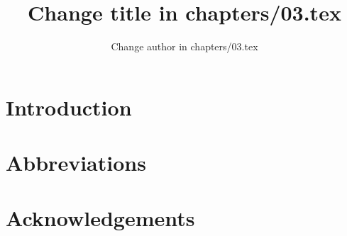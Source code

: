 \documentclass[output=paper]{langsci/langscibook}
\author{Change author in chapters/03.tex}
\title{Change title in chapters/03.tex}
\begin{document}
\section{Introduction} 


\section*{Abbreviations}
\section*{Acknowledgements}

\sloppy
\printbibliography[heading=subbibliography,notkeyword=this] 
\end{document}
